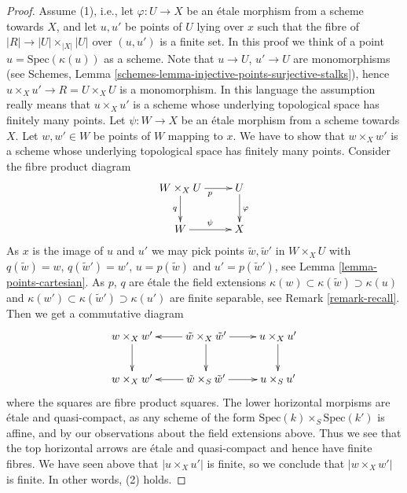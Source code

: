 \begin{proof}
Assume (1), i.e., let $\varphi : U \to X$ be an \'etale morphism from a scheme
towards $X$, and let $u, u'$ be points of $U$ lying over $x$
such that the fibre of $|R| \to |U| \times_{|X|} |U|$ over $(u, u')$
is a finite set. In this proof we think of a point $u = \text{Spec}(\kappa(u))$
as a scheme. Note that $u \to U$, $u' \to U$ are monomorphisms (see
Schemes, Lemma \ref{schemes-lemma-injective-points-surjective-stalks}),
hence $u \times_X u' \to R = U \times_X U$ is a monomorphism.
In this language the assumption really means that
$u \times_X u'$ is a scheme whose underlying topological space has
finitely many points.
Let $\psi : W \to X$ be an \'etale morphism from a scheme towards $X$.
Let $w, w' \in W$ be points of $W$ mapping to $x$.
We have to show that $w \times_X w'$ is a scheme whose underlying topological
space has finitely many points.
Consider the fibre product diagram
$$
\xymatrix{
W \times_X U \ar[r]_p \ar[d]_q & U \ar[d]^\varphi \\
W \ar[r]^\psi & X
}
$$
As $x$ is the image of $u$ and $u'$ we may pick points
$\tilde w, \tilde w'$ in $W \times_X U$ with $q(\tilde w) = w$,
$q(\tilde w') = w'$, $u = p(\tilde w)$ and $u' = p(\tilde w')$, see
Lemma \ref{lemma-points-cartesian}. As $p$, $q$ are \'etale the field extensions
$\kappa(w) \subset \kappa(\tilde w) \supset \kappa(u)$ and
$\kappa(w') \subset \kappa(\tilde w') \supset \kappa(u')$ are
finite separable, see Remark \ref{remark-recall}.
Then we get a commutative diagram
$$
\xymatrix{
w \times_X w' \ar[d] &
\tilde w \times_X \tilde w' \ar[l] \ar[d] \ar[r] &
u \times_X u' \ar[d] \\
w \times_X w' &
\tilde w \times_S \tilde w' \ar[l] \ar[r] &
u \times_S u'
}
$$
where the squares are fibre product squares. The lower horizontal
morpisms are \'etale and quasi-compact, as any scheme of the form
$\text{Spec}(k) \times_S \text{Spec}(k')$ is affine, and by our
observations about the field extensions above.
Thus we see that the top horizontal arrows are \'etale and quasi-compact
and hence have finite fibres.
We have seen above that $|u \times_X u'|$ is finite, so we conclude that
$|w \times_X w'|$ is finite. In other words, (2) holds.


\end{proof}
